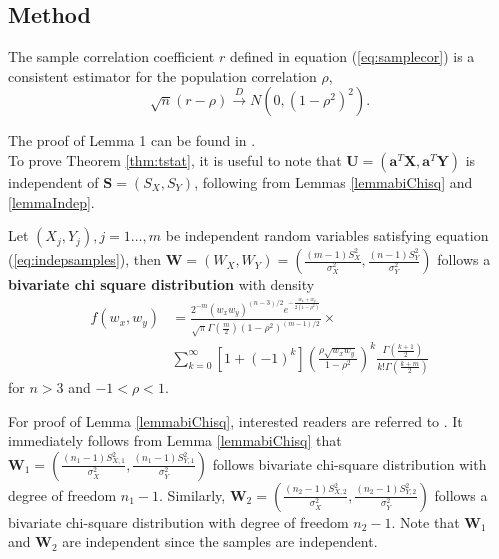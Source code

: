 	
	
	
	
	
	\subsection{Method}\label{section:testcormethod}
	
	\begin{lemma}
		The sample correlation coefficient $r$ defined in equation (\ref{eq:samplecor}) is a 
		consistent estimator for the population correlation $\rho$, 
		\[\sqrt{n}(r - \rho ) \stackrel{D}{\rightarrow}N\left(0, (1-\rho^2)^2\right).\]
	\end{lemma}
	The proof of Lemma 1 can be found in \citet{fisher1915frequency}. \\
	
	To prove Theorem \ref{thm:tstat}, it is useful to note that $\bm U = (\bm a^T\bm X, \bm a^T\bm 
	Y)$ is independent of $\bm S = (S_X, S_Y)$,
	following from Lemmas \ref{lemmabiChisq} and \ref{lemmaIndep}.
	\begin{lemma}\label{lemmabiChisq}
		Let $(X_{j}, Y_{j}), j=1 \ldots,  m$ be independent random variables satisfying equation 
		(\ref{eq:indepsamples}),
		then $\bm W = (W_{X},W_{Y}) =(\frac{(m -1)S_{X}^2}{\sigma_X^2}, 
		\frac{(n-1)S_{Y}^2}{\sigma_Y^2})$ 
		follows a \textbf{bivariate chi square distribution} with density 
		\begin{equation}\label{biChisq}
		\begin{aligned}
		f(w_x, w_y) & = \frac{2^{-m}(w_xw_y)^{(n-3)/2}e^{-\frac{w_x +
					w_y}{2(1-\rho^2)}}}{\sqrt{\pi}\Gamma(\frac{m}{2})(1-\rho^2)^{(m-1)/2}} 
		\times \\
		& \sum_{k=0}^{\infty}[1 +
		(-1)^k]\left(\frac{\rho\sqrt{w_xw_y}}{1-\rho^2}\right)^k\frac{\Gamma(\frac{k+1}{2})}{k!\Gamma(\frac{k+
				m}{2})}
		\end{aligned}
		\end{equation}
		for $n>3$ and $-1<\rho < 1$.
	\end{lemma}
	For proof of Lemma \ref{lemmabiChisq}, interested readers are referred to 
	\citet{joarder2009moments}.
	It immediately follows from Lemma \ref{lemmabiChisq} that $\bm W_1 = (\frac{(n_1 -1)S_{X, 
	1}^2}{\sigma_X^2}, \frac{(n_1-1)S_{Y, 1}^2}{\sigma_Y^2})$ follows bivariate chi-square 
	distribution with degree of freedom $n_1-1$. Similarly, $\bm W_2 =(\frac{(n_2 -1)S_{X, 
	2}^2}{\sigma_X^2}, \frac{(n_2-1)S_{Y, 2}^2}{\sigma_Y^2})$ follows a bivariate chi-square 
	distribution with degree of freedom $n_2-1$.  Note that $\bm W_1$ and $\bm W_2$ are independent 
	since the samples are independent. 
	
